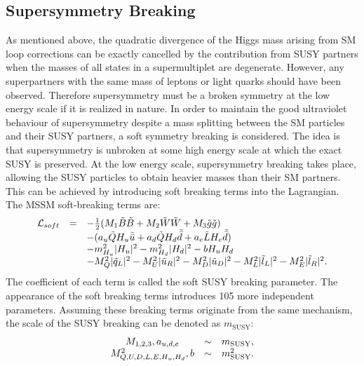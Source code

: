 \documentclass[thesis.tex]{subfiles}
\begin{document}
\subsection{Supersymmetry Breaking}
As mentioned above, the quadratic divergence of the Higgs mass arising from SM loop corrections can be exactly cancelled by the contribution from SUSY partners when the masses of all states in a supermultiplet are degenerate. 
However, any superpartners with the same mass of leptons or light quarks should have been observed. 
Therefore supersymmetry must be a broken symmetry at the low energy scale if it is realized in nature. 
In order to maintain the good ultraviolet behaviour of supersymmetry despite a mass splitting between the SM particles and their SUSY partners, a soft symmetry breaking is considered. 
The idea is that supersymmetry is unbroken at some high energy scale at which the exact SUSY is preserved. 
At the low energy scale, supersymmetry breaking takes place, allowing the SUSY particles to obtain heavier masses than their SM partners.
This can be achieved by introducing soft breaking terms into the Lagrangian. The MSSM soft-breaking terms are:
	\begin{equation}
	\begin{array}{c l l }
		\mathcal{L}_{soft} &=& - \frac{1}{2} ( M_1 \tilde{B} \tilde{B} + M_2 \tilde{W} \tilde{W} + M_3 \tilde{g} \tilde{g} ) \\
					  & & - (a_u\tilde{Q}H_u\tilde{\bar{u}} + a_d\tilde{Q}H_d\tilde{\bar{d}} +  a_e\tilde{L}H_e\tilde{\bar{d}} ) \\
					  & & - m_{H_u}^2 |H_u|^2 - m_{H_d}^2 |H_d|^2 - bH_uH_d \\
			 &  &  - M_Q^2 |\tilde{q}_L |^2 - M_U^2 |\tilde{u}_R |^2  - M_D^2 |\tilde{u}_D |^2 - M_L^2 |\tilde{l}_L |^2 - M_E^2 |\tilde{l}_R |^2.
	\end{array}
	\end{equation}      
The coefficient of each term is called the soft SUSY breaking parameter. 
The appearance of the soft breaking terms introduces 105 more independent parameters. 
Assuming these breaking terms originate from the same mechanism, the scale of the SUSY breaking can be denoted as $m_{\text{SUSY}}$:
	\begin{equation}
		\begin{array}{c c c}
			M_{1,2,3}, a_{u,d,e} & \sim & m_{\text{SUSY}}, \\
			M^2_{Q,U,D,L,E,H_u, H_d}, b & \sim & m^2_{\text{SUSY}}.
		\end{array}
	\end{equation}
\end{document}
